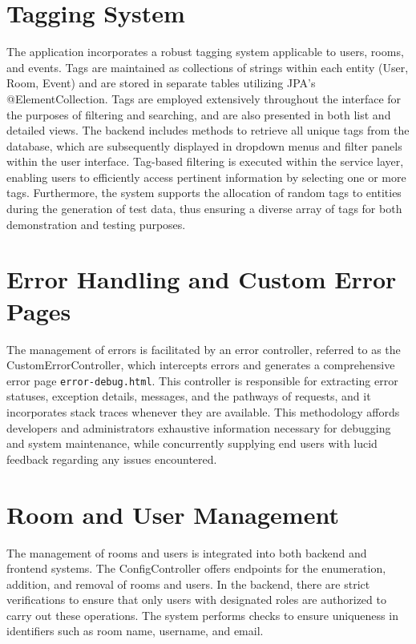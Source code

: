 \section{Tagging System}\label{sec:tagging-system}
The application incorporates a robust tagging system applicable to users, rooms, and events.
Tags are maintained as collections of strings within each entity (User, Room, Event) and are stored in separate tables utilizing JPA's @ElementCollection.
Tags are employed extensively throughout the interface for the purposes of filtering and searching, and are also presented in both list and detailed views.
The backend includes methods to retrieve all unique tags from the database, which are subsequently displayed in dropdown menus and filter panels within the user interface.
Tag-based filtering is executed within the service layer, enabling users to efficiently access pertinent information by selecting one or more tags.
Furthermore, the system supports the allocation of random tags to entities during the generation of test data, thus ensuring a diverse array of tags for both demonstration and testing purposes.


\section{Error Handling and Custom Error Pages}\label{sec:errorHandlingAndCustomErrorPages}
The management of errors is facilitated by an error controller, referred to as the CustomErrorController, which intercepts errors and generates a comprehensive error page \texttt{error-debug.html}.
This controller is responsible for extracting error statuses, exception details, messages, and the pathways of requests, and it incorporates stack traces whenever they are available.
This methodology affords developers and administrators exhaustive information necessary for debugging and system maintenance, while concurrently supplying end users with lucid feedback regarding any issues encountered.


\section{Room and User Management}\label{sec:roomAndUserManagement}
The management of rooms and users is integrated into both backend and frontend systems.
The ConfigController offers endpoints for the enumeration, addition, and removal of rooms and users.
In the backend, there are strict verifications to ensure that only users with designated roles are authorized to carry out these operations.
The system performs checks to ensure uniqueness in identifiers such as room name, username, and email.

